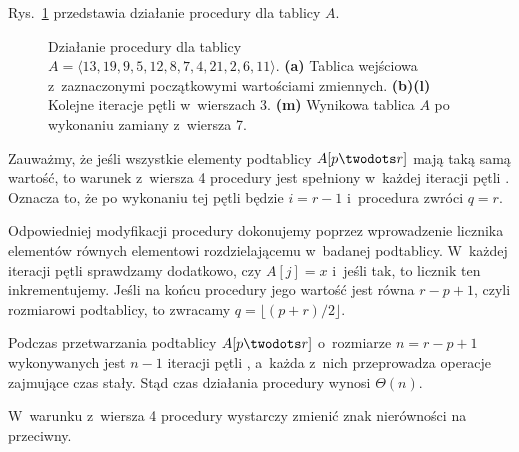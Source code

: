 
\exercise %

\noindent Rys.\ \ref{fig:7.1-1} przedstawia działanie procedury  dla tablicy $A$.
\begin{figure}[!ht]
	\centering 
	\caption{Działanie procedury  dla tablicy $A=\langle13,19,9,5,12,8,7,4,21,2,6,11\rangle$.
{\sffamily\bfseries(a)} Tablica wejściowa z~zaznaczonymi początkowymi wartościami zmiennych.
{\sffamily\bfseries(b)\nbendash(l)} Kolejne iteracje pętli  w~wierszach 3.
{\sffamily\bfseries(m)} Wynikowa tablica $A$ po wykonaniu zamiany z~wiersza 7.} \label{fig:7.1-1}
\end{figure}

\exercise %

\noindent Zauważmy, że jeśli wszystkie elementy podtablicy $A[p\twodots r]$ mają taką samą wartość, to warunek z~wiersza 4 procedury  jest spełniony w~każdej iteracji pętli .
Oznacza to, że po wykonaniu tej pętli będzie $i=r-1$ i~procedura zwróci $q=r$.

Odpowiedniej modyfikacji procedury dokonujemy poprzez wprowadzenie licznika elementów równych elementowi rozdzielającemu w~badanej podtablicy.
W~każdej iteracji pętli  sprawdzamy dodatkowo, czy $A[j]=x$ i~jeśli tak, to licznik ten inkrementujemy.
Jeśli na końcu procedury jego wartość jest równa $r-p+1$, czyli rozmiarowi podtablicy, to zwracamy $q=\lfloor(p+r)/2\rfloor$.

\exercise %
Podczas przetwarzania podtablicy $A[p\twodots r]$ o~rozmiarze $n=r-p+1$ wykonywanych jest $n-1$ iteracji pętli , a~każda z~nich przeprowadza operacje zajmujące czas stały.
Stąd czas działania procedury  wynosi $\Theta(n)$.

\exercise %
W~warunku z~wiersza 4 procedury  wystarczy zmienić znak nierówności na przeciwny.
